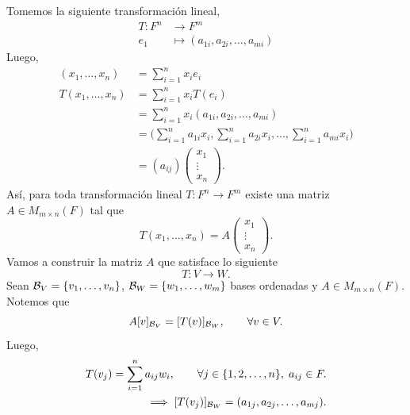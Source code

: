 \documentclass[12pt,a4paper]{book}
\newcommand{\llaves}[1]{\{#1\}}
\begin{document}
    Tomemos la siguiente transformación lineal,
    \begin{align*}
        T : F^{n} & \to F^{m}\\
        e_{1} & \mapsto (a_{1i}, a_{2i}, \dots , a_{mi})
    \end{align*}
    Luego,
    \begin{align*}
        (x_{1}, \dots, x_{n}) & = \sum_{i = 1}^{n}x_{i}e_{i}\\
        T(x_{1}, \dots, x_{n}) & = \sum_{i = 1}^{n}x_{i}T(e_{i})\\
        & = \sum_{i = 1}^{n}x_{i}(a_{1i}, a_{2i}, \dots, a_{mi})\\
        & = \big( \sum_{i = 1}^{n} a_{1i}x_{i}, \sum_{i = 1}^{n} a_{2i}x_{i}, \dots, \sum_{i = 1}^{n} a_{mi}x_{i} \big)\\
        & = (a_{ij})
        \begin{pmatrix}
            x_{1}\\
            \vdots\\
            x_{n}
        \end{pmatrix}.
    \end{align*}
    Así, para toda transformación lineal $T:F^{n} \to F^{m}$ existe una matriz $A \in M_{m \times n}(F)$ tal que
    \begin{equation*}
        T(x_{1}, \dots, x_{n}) = A
        \begin{pmatrix}
            x_{1}\\
            \vdots\\
            x_{n}
        \end{pmatrix}.
    \end{equation*}
    Vamos a construir la matriz $A$ que satisface lo siguiente
    \begin{equation*}
        T: V \to W.
    \end{equation*}
    Sean $\BB_{V} = \llaves{v_{1}, \dots, v_{n}}$, $\BB_{W} = \llaves{w_{1}, \dots, w_{m}}$ bases ordenadas y $A \in M_{m \times n}(F)$. Notemos que
    \begin{equation*}
        A[v]_{\mathcal{B}_{V}} = [T(v)]_{\mathcal{B}_{W}}, \qquad \forall v \in V.
    \end{equation*}
    Luego,
    \begin{align*}
        T(v_{j}) = \sum_{i = 1}^{n}a_{ij}w_{i}, \qquad \forall j \in \llaves{1, 2, \dots, n},\; a_{ij} \in F.\\
        \implies [T(v_{j})]_{\BB_{W}} = (a_{1j}, a_{2j}, \dots, a_{mj}).
    \end{align*}
\end{document}
